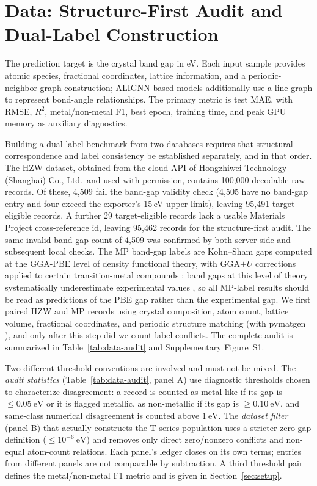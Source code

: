 \documentclass[a4paper,11pt]{article}
\newcommand{\rdsq}{R^2}
\newcommand{\ev}{\mathrm{eV}}
\begin{document}
\section{Data: Structure-First Audit and Dual-Label Construction}
\label{sec:data}

The prediction target is the crystal band gap in eV. Each input sample provides atomic species, fractional coordinates, lattice information, and a periodic-neighbor graph construction; ALIGNN-based models additionally use a line graph to represent bond-angle relationships. The primary metric is test MAE, with RMSE, \(\rdsq\), metal/non-metal F1, best epoch, training time, and peak GPU memory as auxiliary diagnostics.

Building a dual-label benchmark from two databases requires that structural correspondence and label consistency be established separately, and in that order. The HZW dataset, obtained from the cloud API of Hongzhiwei Technology (Shanghai) Co., Ltd.\ and used with permission, contains 100,000 decodable raw records. Of these, 4,509 fail the band-gap validity check (4,505 have no band-gap entry and four exceed the exporter's 15\,eV upper limit), leaving 95,491 target-eligible records. A further 29 target-eligible records lack a usable Materials Project cross-reference id, leaving 95,462 records for the structure-first audit. The same invalid-band-gap count of 4,509 was confirmed by both server-side and subsequent local checks. The MP band-gap labels are Kohn--Sham gaps computed at the GGA-PBE level of density functional theory, with GGA\(+U\) corrections applied to certain transition-metal compounds \cite{jain2013mp}; band gaps at this level of theory systematically underestimate experimental values \cite{perdew1985density}, so all MP-label results should be read as predictions of the PBE gap rather than the experimental gap. We first paired HZW and MP records using crystal composition, atom count, lattice volume, fractional coordinates, and periodic structure matching (with pymatgen \cite{ong2013pymatgen}), and only after this step did we count label conflicts. The complete audit is summarized in Table~\ref{tab:data-audit} and Supplementary Figure~S1.

Two different threshold conventions are involved and must not be mixed. The \emph{audit statistics} (Table~\ref{tab:data-audit}, panel A) use diagnostic thresholds chosen to characterize disagreement: a record is counted as metal-like if its gap is \(\le 0.05\ \ev\) or it is flagged metallic, as non-metallic if its gap is \(\ge 0.10\ \ev\), and same-class numerical disagreement is counted above \(1\ \ev\). The \emph{dataset filter} (panel B) that actually constructs the T-series population uses a stricter zero-gap definition (\(\le 10^{-6}\ \ev\)) and removes only direct zero/nonzero conflicts and non-equal atom-count relations. Each panel's ledger closes on its own terms; entries from different panels are not comparable by subtraction. A third threshold pair defines the metal/non-metal F1 metric and is given in Section~\ref{sec:setup}.
\end{document}
